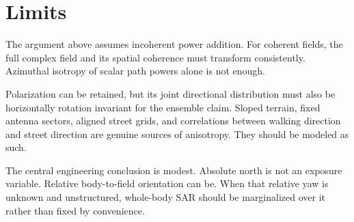 \documentclass[11pt]{article}
\begin{document}
\section{Limits}

The argument above assumes incoherent power addition. For coherent fields, the
full complex field and its spatial coherence must transform consistently.
Azimuthal isotropy of scalar path powers alone is not enough.

Polarization can be retained, but its joint directional distribution must also
be horizontally rotation invariant for the ensemble claim. Sloped terrain,
fixed antenna sectors, aligned street grids, and correlations between walking
direction and street direction are genuine sources of anisotropy. They should
be modeled as such.

The central engineering conclusion is modest. Absolute north is not an exposure
variable. Relative body-to-field orientation can be. When that relative yaw is
unknown and unstructured, whole-body SAR should be marginalized over it rather
than fixed by convenience.
\end{document}
